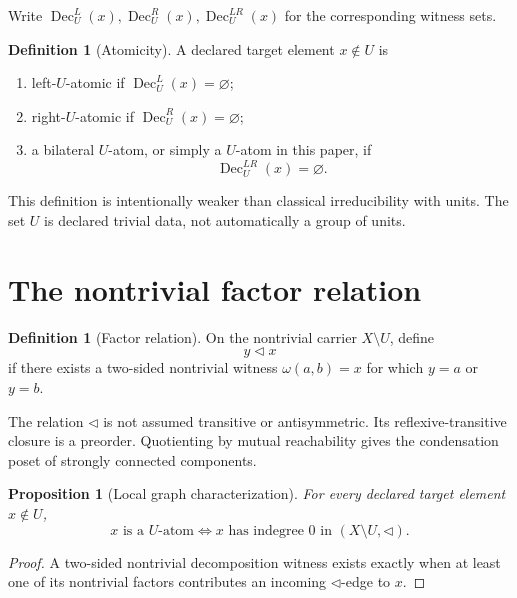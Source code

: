 \documentclass[11pt]{article}
\newtheorem{proposition}[theorem]{Proposition}
\theoremstyle{definition}
\newtheorem{definition}[theorem]{Definition}
\theoremstyle{remark}
\newcommand{\Dec}{\operatorname{Dec}}
\begin{document}
Write \(\Dec_U^L(x),\Dec_U^R(x),\Dec_U^{LR}(x)\) for the corresponding witness sets.

\begin{definition}[Atomicity]
A declared target element \(x\notin U\) is
\begin{enumerate}[label=(\roman*)]
\item left-\(U\)-atomic if \(\Dec_U^L(x)=\varnothing\);
\item right-\(U\)-atomic if \(\Dec_U^R(x)=\varnothing\);
\item a bilateral \(U\)-atom, or simply a \(U\)-atom in this paper, if
\begin{equation}
\Dec_U^{LR}(x)=\varnothing.
\label{eq:atomdef}
\end{equation}
\end{enumerate}
\end{definition}

This definition is intentionally weaker than classical irreducibility with units. The set \(U\) is declared trivial data, not automatically a group of units.

\section{The nontrivial factor relation}

\begin{definition}[Factor relation]
On the nontrivial carrier \(X\setminus U\), define
\begin{equation}
y\triangleleft x
\label{eq:factorrel}
\end{equation}
if there exists a two-sided nontrivial witness \(\omega(a,b)=x\) for which \(y=a\) or \(y=b\).
\end{definition}

The relation \(\triangleleft\) is not assumed transitive or antisymmetric. Its reflexive-transitive closure is a preorder. Quotienting by mutual reachability gives the condensation poset of strongly connected components.

\begin{proposition}[Local graph characterization]
For every declared target element \(x\notin U\),
\begin{equation}
\boxed{x\text{ is a }U\text{-atom}\iff x\text{ has indegree }0\text{ in }(X\setminus U,\triangleleft).}
\label{eq:indegree}
\end{equation}
\end{proposition}

\begin{proof}
A two-sided nontrivial decomposition witness exists exactly when at least one of its nontrivial factors contributes an incoming \(\triangleleft\)-edge to \(x\).
\end{proof}
\end{document}
